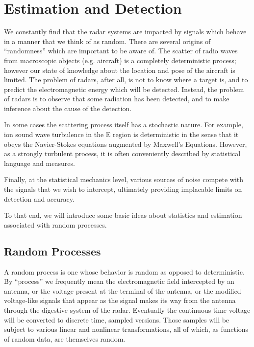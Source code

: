 
\chapter{Estimation and Detection}

{\Huge W}e constantly find that the radar systems are impacted by
signals which behave in a manner that we think of as random.  There
are several origins of ``randomness'' which are important to be aware
of.  The scatter of radio waves from macroscopic objects
(e.g. aircraft) is a completely deterministic process; however our
state of knowledge about the location and pose of the aircraft is
limited.  The problem of radars, after all, is not to know where a 
target is, and to predict the electromagnetic energy which will be
detected.  Instead, the problem of radars is to observe that some
radiation has been detected, and to make inference about the cause of
the detection.

In some cases the scattering process itself has a stochastic nature.
For example, ion sound wave turbulence in the E region is
deterministic in the sense that it obeys the Navier-Stokes equations
augmented by Maxwell's Equations.  However, as a strongly turbulent
process, it is often conveniently described by statistical language
and measures.

Finally, at the statistical mechanics level, various sources of noise
compete with the signals that we wish to intercept, ultimately
providing implacable limits on detection and accuracy.

To that end, we will introduce some basic ideas about statistics and
estimation associated with random processes.


\section{Random Processes}

A random process is one whose behavior is random as opposed to
deterministic.  By ``process'' we frequently mean the electromagnetic
field intercepted by an antenna, or the voltage present at the
terminal of the antenna, or the modified voltage-like signals that
appear as the signal makes its way from the antenna through the digestive system
of the radar.  Eventually the continuous time voltage will be
converted to discrete time, sampled versions.  Those samples will be 
subject to various linear and nonlinear transformations, all of which,
as functions of random data, are themselves random.

